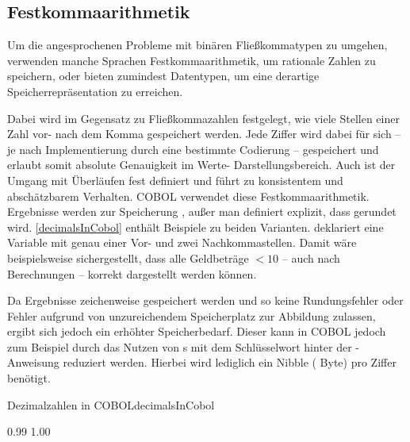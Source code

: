 \subsection*{Festkommaarithmetik}
Um die angesprochenen Probleme mit binären Fließkommatypen zu umgehen, verwenden manche Sprachen Festkommaarithmetik, um rationale Zahlen zu speichern, oder bieten zumindest Datentypen, um eine derartige Speicherrepräsentation zu erreichen. 

Dabei wird im Gegensatz zu Fließkommazahlen festgelegt, wie viele Stellen einer Zahl vor- \bzw nach dem Komma gespeichert werden. Jede Ziffer wird dabei für sich -- je nach Implementierung durch eine bestimmte Codierung -- gespeichert und erlaubt somit absolute Genauigkeit im Werte- \bzw Darstellungsbereich. Auch ist der Umgang mit Überläufen fest definiert und führt zu konsistentem und abschätzbarem Verhalten. COBOL verwendet diese Festkommaarithmetik. Ergebnisse werden zur Speicherung , außer man definiert explizit, dass gerundet wird. \autoref{decimalsInCobol} enthält Beispiele zu beiden Varianten.  deklariert eine Variable mit genau einer Vor- und zwei Nachkommastellen. Damit wäre beispielsweise sichergestellt, dass alle Geldbeträge $<10$ -- auch nach Berechnungen -- korrekt dargestellt werden können.

Da Ergebnisse zeichenweise gespeichert werden und so keine Rundungsfehler oder Fehler aufgrund von unzureichendem Speicherplatz zur Abbildung zulassen, ergibt sich jedoch ein erhöhter Speicherbedarf. Dieser kann in COBOL jedoch zum Beispiel durch das Nutzen von s mit dem Schlüsselwort  hinter der -Anweisung reduziert werden. Hierbei wird lediglich ein Nibble ( Byte) pro Ziffer benötigt.

\begin{codeWithCaption}{Dezimalzahlen in COBOL}{decimalsInCobol}
     \cFollow
    \begin{shellwindow}
    0.99
    1.00
    \end{shellwindow}
\end{codeWithCaption}

